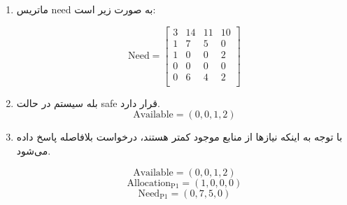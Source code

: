 \begin{qsolve}
	
\begin{enumerate}
	\item ماتریس need به صورت زیر است:


\[
\text{Need} =
\begin{bmatrix}
	3 & 14 & 11 & 10 \\
	1 & 7 & 5 & 0 \\
	1 & 0 & 0 & 2 \\
	0 & 0 & 0 & 0 \\
	0 & 6 & 4 & 2 \\
\end{bmatrix}
\]


	\item بله سیستم در حالت safe قرار دارد.
	\[
	\text{Available} = (0, 0, 1, 2)
	\]

	\item با توجه به اینکه نیازها از منابع موجود کمتر هستند، درخواست بلافاصله پاسخ داده می‌شود.
	
	\[
	\text{Available} = (0, 0, 1, 2)
	\]
	\[
	\text{Allocation}_{\text{P1}} = (1, 0, 0, 0)
	\]
	\[
	\text{Need}_{\text{P1}} = (0, 7, 5, 0)
	\]
\end{enumerate}

\end{qsolve}





